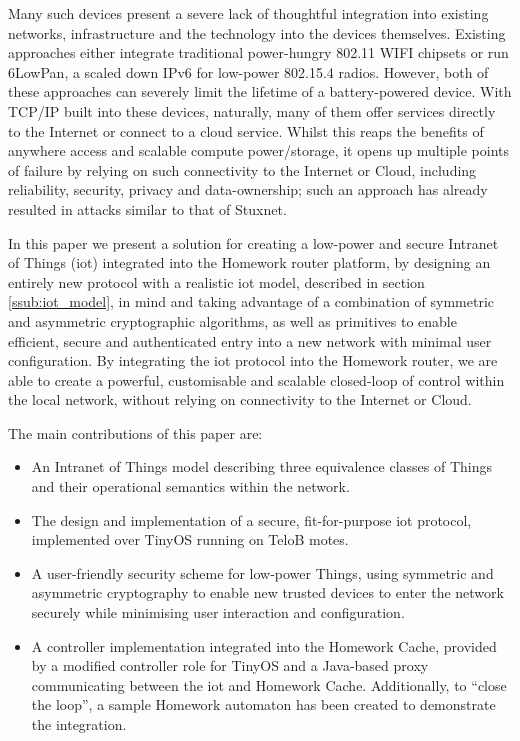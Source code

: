 \documentclass{mpaper}
\begin{document}
Many such devices present a severe lack of thoughtful integration into existing networks, infrastructure and the technology into the devices themselves. Existing approaches either integrate traditional power-hungry 802.11 WIFI chipsets or run 6LowPan, a scaled down IPv6 for low-power 802.15.4 radios. However, both of these approaches can severely limit the lifetime of a battery-powered device. With TCP/IP built into these devices, naturally, many of them offer services directly to the Internet\cite{MQTT,IETF_CORE,Xively} or connect to a cloud service\cite{SmartThings,Twine}. Whilst this reaps the benefits of anywhere access and scalable compute power/storage, it opens up multiple points of failure by relying on such connectivity to the Internet or Cloud, including reliability, security, privacy and data-ownership; such an approach has already resulted in attacks similar to that of Stuxnet\cite{IoTWorm}.

In this paper we present a solution for creating a low-power and secure Intranet of Things (iot) integrated into the Homework router platform, by designing an entirely new protocol with a realistic iot model, described in section \ref{ssub:iot_model}, in mind and taking advantage of a combination of symmetric and asymmetric cryptographic algorithms, as well as primitives to enable efficient, secure and authenticated entry into a new network with minimal user configuration. By integrating the iot protocol into the Homework router, we are able to create a powerful, customisable and scalable closed-loop of control within the local network, without relying on connectivity to the Internet or Cloud\cite{DEBSChallenge,HomeworkProject}.

The main contributions of this paper are:
\begin{itemize}
  \item An Intranet of Things model describing three equivalence classes of Things and their operational semantics within the network.
  \item The design and implementation of a secure, fit-for-purpose iot protocol, implemented over TinyOS running on TeloB motes.
  \item A user-friendly security scheme for low-power Things, using symmetric and asymmetric cryptography to enable new trusted devices to enter the network securely while minimising user interaction and configuration.
  \item A controller implementation integrated into the Homework Cache, provided by a modified controller role for TinyOS and a Java-based proxy communicating between the iot and Homework Cache. Additionally, to ``close the loop'', a sample Homework automaton has been created to demonstrate the integration.
\end{itemize}
\end{document}

